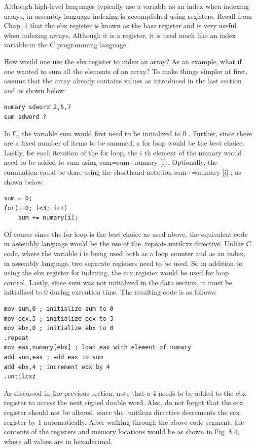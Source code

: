 \documentclass[10pt]{book}
\begin{document}
Although high-level languages typically use a variable as an index when indexing arrays, in assembly language indexing is accomplished using registers. Recall from Chap. 1 that the ebx register is known as the base register and is very useful when indexing arrays. Although it is a register, it is used much like an index variable in the C programming language.

How would one use the ebx register to index an array? As an example, what if one wanted to sum all the elements of an array? To make things simpler at first, assume that the array already contains values as introduced in the last section and as shown below:

\begin{verbatim}
numary sdword 2,5,7
sum sdword ?
\end{verbatim}

In C, the variable sum would first need to be initialized to 0 . Further, since there are a fixed number of items to be summed, a for loop would be the best choice. Lastly, for each iteration of the for loop, the $i$ th element of the numary would need to be added to sum using sum=sum+numary [i];. Optionally, the summation could be done using the shorthand notation sum+=numary [i] ; as shown below:

\begin{verbatim}
sum = 0;
for(i=0; i<3; i++)
    sum += numary[i];
\end{verbatim}

Of course since the for loop is the best choice as used above, the equivalent code in assembly language would be the use of the .repeat-.untilcxz directive. Unlike C code, where the variable i is being used both as a loop counter and as an index, in assembly language, two separate registers need to be used. So in addition to using the ebx register for indexing, the ecx register would be used for loop control. Lastly, since sum was not initialized in the data section, it must be initialized to 0 during execution time. The resulting code is as follows:


\begin{verbatim}
mov sum,0 ; initialize sum to 0
mov ecx,3 ; initialize ecx to 3
mov ebx,0 ; initialize ebx to 0
.repeat
mov eax,numary[ebx] ; load eax with element of numary
add sum,eax ; add eax to sum
add ebx,4 ; increment ebx by 4
.untilcxz
\end{verbatim}

As discussed in the previous section, note that a 4 needs to be added to the ebx register to access the next signed double word. Also, do not forget that the ecx register should not be altered, since the .untilcxz directive decrements the ecx register by 1 automatically. After walking through the above code segment, the contents of the registers and memory locations would be as shown in Fig. 8.4, where all values are in hexadecimal.
\end{document}
